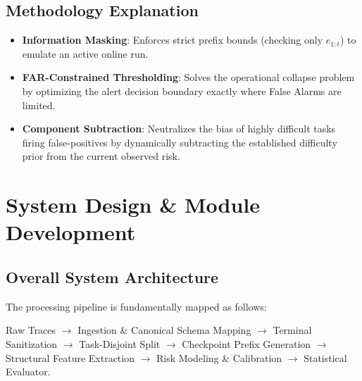 \documentclass[12pt,a4paper]{article}
\begin{document}
\subsection{Methodology Explanation}
\begin{itemize}
    \item \textbf{Information Masking}: Enforces strict prefix bounds (checking only $e_{1:t}$) to emulate an active online run.
    \item \textbf{FAR-Constrained Thresholding}: Solves the operational collapse problem by optimizing the alert decision boundary exactly where False Alarms are limited.
    \item \textbf{Component Subtraction}: Neutralizes the bias of highly difficult tasks firing false-positives by dynamically subtracting the established difficulty prior from the current observed risk.
\end{itemize}

\newpage


\newpage

\section{System Design \& Module Development}

\subsection{Overall System Architecture}
The processing pipeline is fundamentally mapped as follows:

Raw Traces $\rightarrow$ Ingestion \& Canonical Schema Mapping $\rightarrow$ Terminal Sanitization $\rightarrow$ Task-Disjoint Split $\rightarrow$ Checkpoint Prefix Generation $\rightarrow$ Structural Feature Extraction $\rightarrow$ Risk Modeling \& Calibration $\rightarrow$ Statistical Evaluator.
\end{document}
